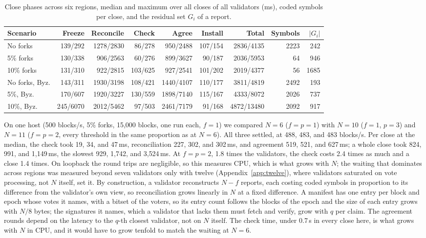 \documentclass[conference]{IEEEtran}
\begin{document}
\begin{table}[t]
\caption{Close phases across six regions, median and maximum over all closes of all validators (ms), coded symbols per close, and the residual set $G_i$ of a report.}
\label{tab:closecost}
\centering\small
\begin{tabular}{@{}lrrrrrrrr@{}}
\toprule
Scenario & Freeze & Reconcile & Check & Agree & Install & Total & Symbols & $|G_i|$\\
\midrule
No forks & 139/292 & 1278/2830 & 86/278 & 950/2488 & 107/154 & 2836/4135 & 2223 & 242\\
5\% forks & 130/338 & 906/2563 & 60/276 & 899/3627 & 90/187 & 2036/5953 & 64 & 946\\
10\% forks & 131/310 & 922/2815 & 103/625 & 927/2541 & 101/202 & 2019/4377 & 56 & 1685\\
No forks, Byz. & 143/311 & 1930/3198 & 108/421 & 1440/4107 & 110/177 & 3811/4819 & 2492 & 193\\
5\%, Byz. & 170/607 & 1920/3227 & 130/559 & 1898/7140 & 115/167 & 4333/8072 & 2026 & 737\\
10\%, Byz. & 245/6070 & 2012/5462 & 97/503 & 2461/7179 & 91/168 & 4872/13480 & 2092 & 917\\
\bottomrule
\end{tabular}
\end{table}

On one host (500 blocks/s, 5\% forks, 15{,}000 blocks, one run each, $f=1$) we compared $N=6$ ($f=p=1$) with $N=10$ ($f=1$, $p=3$) and $N=11$ ($f=p=2$, every threshold in the same proportion as at $N=6$). All three settled, at 488, 483, and 483 blocks/s. Per close at the median, the check took 19, 34, and 47\,ms, reconciliation 227, 302, and 302\,ms, and agreement 519, 521, and 627\,ms; a whole close took 824, 991, and 1{,}149\,ms, the slowest 929, 1{,}742, and 3{,}524\,ms. At $f=p=2$, 1.8 times the validators, the check costs 2.4 times as much and a close 1.4 times. On loopback the round trips are negligible, so this measures CPU, which is what grows with $N$; the waiting that dominates across regions was measured beyond seven validators only with twelve (Appendix~\ref{app:twelve}), where validators saturated on vote processing, not $N$ itself, set it. By construction, a validator reconstructs $N-f$ reports, each costing coded symbols in proportion to its difference from the validator's own view, so reconciliation grows linearly in $N$ at a fixed difference. A manifest has one entry per block and epoch whose votes it names, with a bitset of the voters, so its entry count follows the blocks of the epoch and the size of each entry grows with $N/8$ bytes; the signatures it names, which a validator that lacks them must fetch and verify, grow with $q$ per claim. The agreement rounds depend on the latency to the $q$-th closest validator, not on $N$ itself. The check time, under 0.7\,s in every close here, is what grows with $N$ in CPU, and it would have to grow tenfold to match the waiting at $N=6$.
\end{document}
